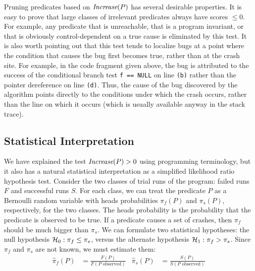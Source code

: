 Pruning predicates based on $\textit{Increase}(P)$ has several desirable
properties.  It is easy to prove that large classes of irrelevant
predicates always have scores $\leq 0$.  For example, any predicate
that is unreachable, that is a program invariant, or that is obviously
control-dependent on a true cause is eliminated by this test.  It is
also worth pointing out that this test tends to localize bugs at
a point where the condition that causes the bug first becomes true, rather than at
the crash site.  For example, in the code fragment given above, the bug is
attributed to the success of the conditional branch test \texttt{f ==
NULL} on line \texttt{(b)} rather than the pointer dereference on line
\texttt{(d)}.  Thus, the cause of the bug discovered by the algorithm
points directly to the conditions under which the crash occurs, rather than
the line on which it occurs (which is usually available anyway in the
stack trace).

\subsection{Statistical Interpretation}
\label{sec:statisticalinterpretation}

We have explained the test $\textit{Increase}(P) > 0$ using programming terminology,
but it also has a natural statistical interpretation as a simplified likelihood ratio hypothesis
test.  Consider the two classes of trial runs
of the program: failed runs $F$ and successful runs $S$.  For each
class, we can treat the predicate $P$ as a Bernoulli random variable
with heads probabilities $\pi_f(P)$ and $\pi_s(P)$, respectively, for the
two classes.  The heads
probability is the probability that the predicate is observed to be
true.  If a predicate causes a set of crashes, then $\pi_f$ should be
much bigger than $\pi_s$.  We can formulate two statistical hypotheses:
the null hypothesis ${\mathcal{H}}_0:
\pi_f \leq \pi_s$, versus the alternate hypothesis ${\mathcal{H}}_1: \pi_f > \pi_s$.  Since
$\pi_f$ and $\pi_s$ are not known, we must estimate them:
\begin{align*}
  \hat \pi_f(P) &= \frac{F(P)}{F(\text{$P$ observed})} &
  \hat \pi_s(P) &= \frac{S(P)}{S(\text{$P$  observed})}
\end{align*}

